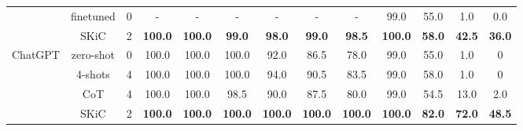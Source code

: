 \documentclass{article} \usepackage{arxiv}
\begin{document}
\begin{table}[t]
{\begin{tabular}{c|c|c|cc|cccc||cc|cc}
                             & finetuned &0 &- &- &- & - &- & -& 99.0 &55.0 & 1.0  &0.0 \\ 
                           & SKiC  &2   & \textbf{100.0}                   & \textbf{100.0}                   & \textbf{99.0}  & \textbf{98.0}  & \textbf{99.0}  & \textbf{98.5}   & \textbf{100.0}                   & \textbf{58.0}                    & \textbf{42.5}                    & \textbf{36.0}                    \\  \midrule
\multirow{4}{*}{ChatGPT}   & zero-shot  &0                & 100.0                            & 100.0                            & 100.0          & 92.0           & 86.5           & 78.0           & 99.0                            & 55.0                            & 1.0                             & 0                              \\
                           & 4-shots   &4             & 100.0                            & 100.0                            & 100.0          & 94.0           & 90.5           & 83.5           & 99.0                             & 58.0                             & 1.0                              & 0                              \\
                           & CoT     &4              & 100.0                            & 100.0                            & 98.5           & 90.0           & 87.5           & 80.0           & 99.0                             & 54.5                             & 13.0                              & 2.0                              \\
                           & SKiC &2      & \textbf{100.0}                   & \textbf{100.0}                   & \textbf{100.0} & \textbf{100.0} & \textbf{100.0} & \textbf{100.0} & \textbf{100.0}                   & \textbf{82.0}                    & \textbf{72.0}                    & \textbf{48.5}                    \\ \bottomrule
\end{tabular} 
}
\end{table}
\end{document}
